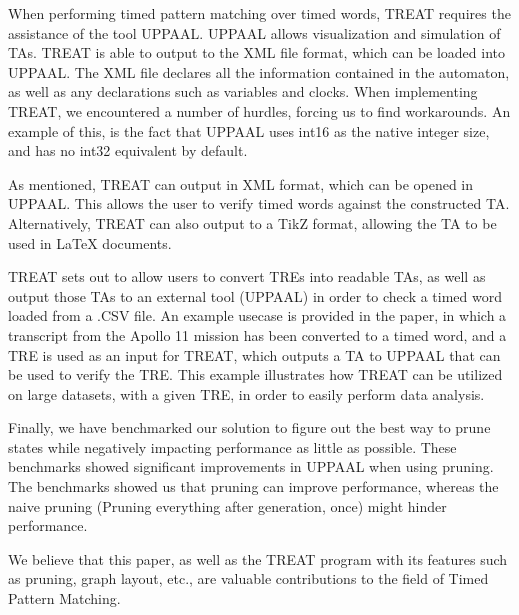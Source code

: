 When performing timed pattern matching over timed words, TREAT requires the assistance of the tool UPPAAL. UPPAAL allows visualization and simulation of TAs.
TREAT is able to output to the XML file format, which can be loaded into UPPAAL. The XML file declares all the information contained in the automaton, as well as any declarations such as variables and clocks. When implementing TREAT, we encountered a number of hurdles, forcing us to find workarounds. An example of this, is the fact that UPPAAL uses int16 as the native integer size, and has no int32 equivalent by default.

As mentioned, TREAT can output in XML format, which can be opened in UPPAAL. This allows the user to verify timed words against the constructed TA. Alternatively, TREAT can also output to a TikZ format, allowing the TA to be used in LaTeX documents.

TREAT sets out to allow users to convert TREs into readable TAs, as well as output those TAs to an external tool (UPPAAL) in order to check a timed word loaded from a .CSV file.
An example usecase is provided in the paper, in which a transcript from the Apollo 11 mission has been converted to a timed word, and a TRE is used as an input for TREAT, which outputs a TA to UPPAAL that can be used to verify the TRE. This example illustrates how TREAT can be utilized on large datasets, with a given TRE, in order to easily perform data analysis.

Finally, we have benchmarked our solution to figure out the best way to prune states while negatively impacting performance as little as possible. These benchmarks showed significant improvements in UPPAAL when using pruning. The benchmarks showed us that pruning can improve performance, whereas the naive pruning (Pruning everything after generation, once) might hinder performance.

We believe that this paper, as well as the TREAT program with its features such as pruning, graph layout, etc., are valuable contributions to the field of Timed Pattern Matching.